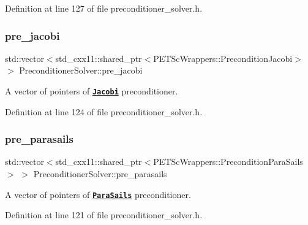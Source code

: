 Definition at line 127 of file preconditioner\+\_\+solver.\+h.

\mbox{\label{class_preconditioner_solver_ab2379323cfbca020045ec5dd4ab708dc}} 
\subsubsection{\texorpdfstring{pre\+\_\+jacobi}{pre\_jacobi}}
{\footnotesize\ttfamily std\+::vector$<$std\+\_\+cxx11\+::shared\+\_\+ptr$<$P\+E\+T\+Sc\+Wrappers\+::\+Precondition\+Jacobi$>$ $>$ Preconditioner\+Solver\+::pre\+\_\+jacobi\hspace{0.3cm}{\ttfamily [private]}}



A vector of pointers of \href{https://www.dealii.org/8.5.0/doxygen/deal.II/classPETScWrappers_1_1PreconditionJacobi.html}{\tt {\bfseries Jacobi}} preconditioner. 



Definition at line 124 of file preconditioner\+\_\+solver.\+h.

\mbox{\label{class_preconditioner_solver_a90b15442f60786b56729f2756e191336}} 
\subsubsection{\texorpdfstring{pre\+\_\+parasails}{pre\_parasails}}
{\footnotesize\ttfamily std\+::vector$<$std\+\_\+cxx11\+::shared\+\_\+ptr$<$P\+E\+T\+Sc\+Wrappers\+::\+Precondition\+Para\+Sails$>$ $>$ Preconditioner\+Solver\+::pre\+\_\+parasails\hspace{0.3cm}{\ttfamily [private]}}



A vector of pointers of \href{https://www.dealii.org/8.5.0/doxygen/deal.II/classPETScWrappers_1_1PreconditionParaSails.html}{\tt {\bfseries Para\+Sails}} preconditioner. 



Definition at line 121 of file preconditioner\+\_\+solver.\+h.

